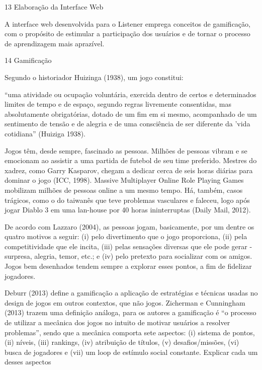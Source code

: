 13 Elabora\c{c}\~ao da Interface Web

A interface web desenvolvida para o Listener emprega conceitos de
gamifica\c{c}\~ao, com o prop\'osito de estimular a participa\c{c}\~ao dos usu\'arios e
de tornar o processo de aprendizagem mais apraz\'ivel.

14 Gamifica\c{c}\~ao

Segundo o historiador Huizinga (1938), um jogo constitui:

``uma atividade ou ocupa\c{c}\~ao volunt\'aria, exercida dentro de certos e
determinados limites de tempo e de espa\c{c}o, segundo regras livremente
consentidas, mas absolutamente obrigat\'orias, dotado de um fim em si
mesmo, acompanhado de um sentimento de tens\~ao e de alegria e de uma
consci\^encia de ser diferente da 'vida cotidiana'' (Huiziga 1938).

Jogos t\^em, desde sempre, fascinado as pessoas. Milh\~oes de pessoas vibram
e se emocionam ao assistir a uma partida de futebol de seu time
preferido. Mestres do xadrez, como Garry Kasparov, chegam a dedicar
cerca de seis horas di\'arias para dominar o jogo (ICC, 1998). Massive
Multiplayer Online Role Playing Games mobilizam milh\~oes de pessoas
online a um mesmo tempo. H\'a, tamb\'em, casos tr\'agicos, como o do taiwan\^es
que teve problemas vasculares e faleceu, logo ap\'os jogar Diablo 3 em uma
lan-house por 40 horas ininterruptas (Daily Mail, 2012).

De acordo com Lazzaro (2004), as pessoas jogam, basicamente, por um
dentre os quatro motivos a seguir: (i) pelo divertimento que o jogo
proporciona, (ii) pela competitividade que ele incita, (iii) pelas
sensa\c{c}\~oes diversas que ele pode gerar - surpresa, alegria, temor, etc.;
e (iv) pelo pretexto para socializar com os amigos. Jogos bem desenhados
tendem sempre a explorar esses pontos, a fim de fidelizar jogadores.

Deburr (2013) define a gamifica\c{c}\~ao a aplica\c{c}\~ao de estrat\'egias e t\'ecnicas
usadas no design de jogos em outros contextos, que n\~ao jogos. Zicherman
e Cunningham (2013) trazem uma defini\c{c}\~ao an\'aloga, para os autores a
gamifica\c{c}\~ao \'e ``o processo de utilizar a mec\^anica dos jogos no intuito
de motivar usu\'arios a resolver problemas'', sendo que a mec\^anica
comporta sete aspectos: (i) sistema de pontos, (ii) n\'iveis, (iii)
rankings, (iv) atribui\c{c}\~ao de t\'itulos, (v) desafios/miss\~oes, (vi) busca
de jogadores e (vii) um loop de est\'imulo social constante. Explicar cada
um desses aspectos

